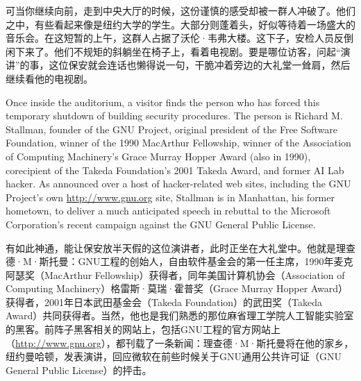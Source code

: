 \ifdefined\chs
可当你继续向前，走到中央大厅的时候，这份谨慎的感受却被一群人冲破了。他们之中，有些看起来像是纽约大学的学生。大部分则蓬着头，好似等待着一场盛大的音乐会。在这短暂的上午，这群人占据了沃伦·韦弗大楼。这下子，安检人员反倒闲下来了。他们不规矩的斜躺坐在椅子上，看着电视剧。要是哪位访客，问起``演讲''的事，这位保安就会连话也懒得说一句，干脆冲着旁边的大礼堂一耸肩，然后继续看他的电视剧。
\fi

\ifdefined\eng
Once inside the auditorium, a visitor finds the person who has forced this temporary shutdown of building security procedures. The person is Richard M. Stallman, founder of the GNU Project, original president of the Free Software Foundation, winner of the 1990 MacArthur Fellowship, winner of the Association of Computing Machinery's Grace Murray Hopper Award (also in 1990), corecipient of the Takeda Foundation's 2001 Takeda Award, and former AI Lab hacker. As announced over a host of hacker-related web sites, including the GNU Project's own \url{http://www.gnu.org} site, Stallman is in Manhattan, his former hometown, to deliver a much anticipated speech in rebuttal to the Microsoft Corporation's recent campaign against the GNU General Public License.
\fi

\ifdefined\chs
有如此神通，能让保安放半天假的这位演讲者，此时正坐在大礼堂中。他就是理查德·M·斯托曼：GNU工程的创始人，自由软件基金会的第一任主席，1990年麦克阿瑟奖（MacArthur Fellowship）获得者，同年美国计算机协会（Association of Computing Machinery）格雷斯·莫瑞·霍普奖（Grace Murray Hopper Award）获得者，2001年日本武田基金会（Takeda Foundation）的武田奖（Takeda Award）共同获得者。当然，他也是我们熟悉的那位麻省理工学院人工智能实验室的黑客。前阵子黑客相关的网站上，包括GNU工程的官方网站上（\url{http://www.gnu.org}），都刊载了一条新闻：理查德·M·斯托曼将在他的家乡，纽约曼哈顿，发表演讲，回应微软在前些时候关于GNU通用公共许可证（GNU General Public License）的抨击。
\fi

